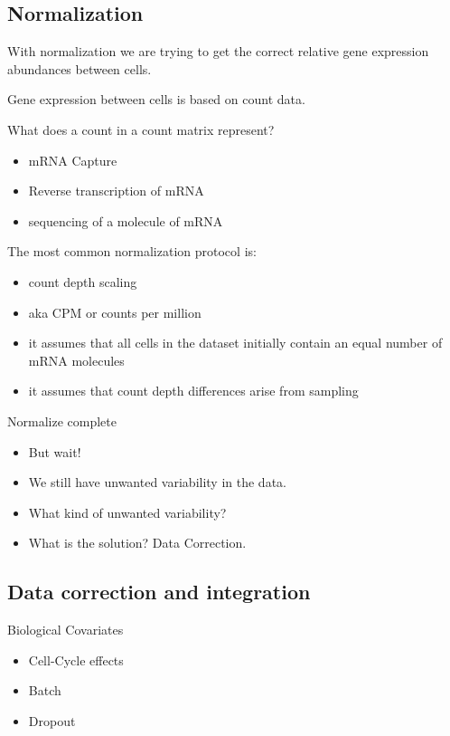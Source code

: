 \documentclass[
]{book}
\providecommand{\tightlist}{%
  \setlength{\itemsep}{0pt}\setlength{\parskip}{0pt}}
\begin{document}
\hypertarget{normalization}{%
\subsection{Normalization}\label{normalization}}

With normalization we are trying to get the correct relative gene expression abundances between cells.

Gene expression between cells is based on count data.

What does a count in a count matrix represent?

\begin{itemize}
\tightlist
\item
  mRNA Capture
\item
  Reverse transcription of mRNA
\item
  sequencing of a molecule of mRNA
\end{itemize}

The most common normalization protocol is:

\begin{itemize}
\tightlist
\item
  count depth scaling
\item
  aka CPM or counts per million
\item
  it assumes that all cells in the dataset initially contain an equal number of mRNA molecules
\item
  it assumes that count depth differences arise from sampling
\end{itemize}

Normalize complete

\begin{itemize}
\tightlist
\item
  But wait!
\item
  We still have unwanted variability in the data.
\item
  What kind of unwanted variability?
\item
  What is the solution? Data Correction.
\end{itemize}

\hypertarget{data-correction-and-integration}{%
\subsection{Data correction and integration}\label{data-correction-and-integration}}

Biological Covariates

\begin{itemize}
\tightlist
\item
  Cell-Cycle effects
\item
  Batch
\item
  Dropout
\end{itemize}
\end{document}
